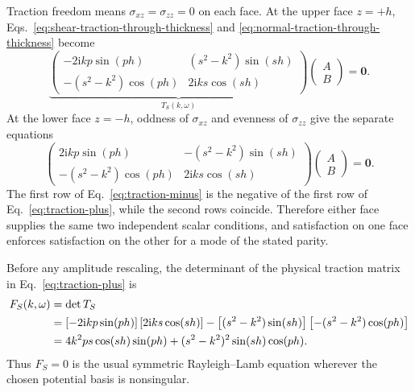 Traction freedom means \(\sigma_{xz}=\sigma_{zz}=0\) on each face.  At the
upper face \(z=+h\), Eqs.~\eqref{eq:shear-traction-through-thickness} and
\eqref{eq:normal-traction-through-thickness} become
\begin{equation}
  \underbrace{\begin{pmatrix}
    -2\mathrm{i}kp\sin(ph) & (s^2-k^2)\sin(sh)\\
    -(s^2-k^2)\cos(ph) & 2\mathrm{i}ks\cos(sh)
  \end{pmatrix}}_{\displaystyle T_S(k,\omega)}
  \begin{pmatrix}A\\B\end{pmatrix}=\mathbf{0}.
  \label{eq:traction-plus}
\end{equation}
At the lower face \(z=-h\), oddness of \(\sigma_{xz}\) and evenness of
\(\sigma_{zz}\) give the separate equations
\begin{equation}
  \begin{pmatrix}
    2\mathrm{i}kp\sin(ph) & -(s^2-k^2)\sin(sh)\\
    -(s^2-k^2)\cos(ph) & 2\mathrm{i}ks\cos(sh)
  \end{pmatrix}
  \begin{pmatrix}A\\B\end{pmatrix}=\mathbf{0}.
  \label{eq:traction-minus}
\end{equation}
The first row of Eq.~\eqref{eq:traction-minus} is the negative of the first
row of Eq.~\eqref{eq:traction-plus}, while the second rows coincide.
Therefore either face supplies the same two independent scalar conditions,
and satisfaction on one face enforces satisfaction on the other for a mode
of the stated parity.

Before any amplitude rescaling, the determinant of the physical traction
matrix in Eq.~\eqref{eq:traction-plus} is
\begin{align}
  F_S(k,\omega)
  &=\det T_S                                                        \notag\\
  &=\left[-2\mathrm{i}kp\sin(ph)\right]
    \left[2\mathrm{i}ks\cos(sh)\right]
   -\left[(s^2-k^2)\sin(sh)\right]
    \left[-(s^2-k^2)\cos(ph)\right]                                \notag\\
  &=4k^2ps\cos(sh)\sin(ph)
    +(s^2-k^2)^2\sin(sh)\cos(ph).
  \label{eq:original-traction-determinant}
\end{align}
Thus \(F_S=0\) is the usual symmetric Rayleigh--Lamb equation wherever the
chosen potential basis is nonsingular.

